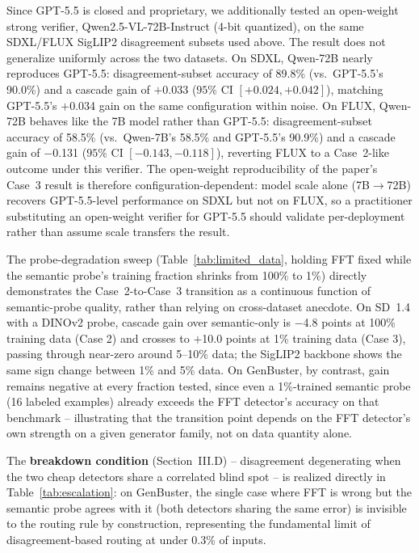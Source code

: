 \documentclass{ieeeaccess}
\begin{document}
Since GPT-5.5 is closed and proprietary, we additionally tested an open-weight strong
verifier, Qwen2.5-VL-72B-Instruct (4-bit quantized), on the same SDXL/FLUX SigLIP2
disagreement subsets used above. The result does not generalize uniformly across the
two datasets. On SDXL, Qwen-72B nearly reproduces GPT-5.5: disagreement-subset accuracy
of 89.8\% (vs.\ GPT-5.5's 90.0\%) and a cascade gain of $+$0.033 ($95\%$ CI
$[+0.024, +0.042]$), matching GPT-5.5's $+$0.034 gain on the same configuration within
noise. On FLUX, Qwen-72B behaves like the 7B model rather than GPT-5.5: disagreement-subset
accuracy of 58.5\% (vs.\ Qwen-7B's 58.5\% and GPT-5.5's 90.9\%) and a cascade gain of
$-$0.131 ($95\%$ CI $[-0.143, -0.118]$), reverting FLUX to a Case~2-like outcome under this
verifier. The open-weight reproducibility of the paper's Case~3 result is therefore
configuration-dependent: model scale alone (7B$\to$72B) recovers GPT-5.5-level performance
on SDXL but not on FLUX, so a practitioner substituting an open-weight verifier for GPT-5.5
should validate per-deployment rather than assume scale transfers the result.

The probe-degradation sweep (Table~\ref{tab:limited_data}, holding FFT fixed while the
semantic probe's training fraction shrinks from 100\% to 1\%) directly demonstrates the
Case~2-to-Case~3 transition as a continuous function of semantic-probe quality, rather
than relying on cross-dataset anecdote. On SD~1.4 with a DINOv2 probe, cascade gain over
semantic-only is $-$4.8 points at 100\% training data (Case 2) and crosses to $+$10.0
points at 1\% training data (Case 3), passing through near-zero around 5--10\% data; the
SigLIP2 backbone shows the same sign change between 1\% and 5\% data. On GenBuster, by
contrast, gain remains negative at every fraction tested, since even a 1\%-trained
semantic probe (16 labeled examples) already exceeds the FFT detector's accuracy on that
benchmark -- illustrating that the transition point depends on the FFT detector's own
strength on a given generator family, not on data quantity alone.

The \textbf{breakdown condition} (Section~III.D) -- disagreement degenerating when the two
cheap detectors share a correlated blind spot -- is realized directly in
Table~\ref{tab:escalation}: on GenBuster, the single case where FFT is wrong but the
semantic probe agrees with it (both detectors sharing the same error) is invisible to the
routing rule by construction, representing the fundamental limit of disagreement-based
routing at under 0.3\% of inputs.
\end{document}
